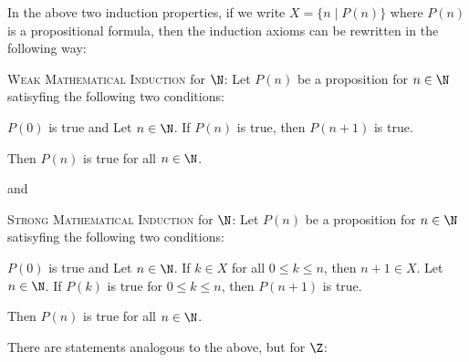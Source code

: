 In the above two induction properties, if we write $X = \{n \mid P(n)\}$ where
$P(n)$ is a propositional formula,
then the induction axioms can be rewritten in the
following way:

\begin{enumerate}[nosep]
  \li \textsc{Weak Mathematical Induction} for $\N$:
  Let $P(n)$ be a proposition for $n \in \N$ satisyfing the following two
  conditions:
  \begin{enumerate}[nosep]
    \li $P(0)$ is true and
    \li Let $n \in \N$. If $P(n)$ is true, then $P(n+1)$ is true.
  \end{enumerate}
  Then $P(n)$ is true for all $n \in \N$.
\end{enumerate}
and
\begin{enumerate}[nosep]
  \li \textsc{Strong Mathematical Induction} for $\N$:
  Let $P(n)$ be a proposition for $n \in \N$ satisyfing the following two
  conditions:
  \begin{enumerate}[nosep]
    \li $P(0)$ is true and
    \li Let $n \in \N$. If $k \in X$ for all $0 \leq k \leq n$,
    then $n + 1 \in X$.
    \li Let $n \in \N$. If $P(k)$ is true for $0 \leq k \leq n$,
    then $P(n+1)$ is true.
  \end{enumerate}
  Then $P(n)$ is true for all $n \in \N$.
\end{enumerate}

There are statements analogous to the above, but for $\Z$:


